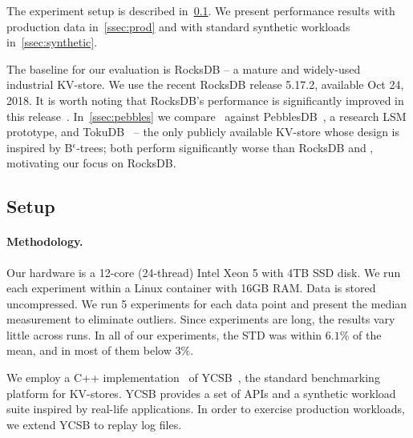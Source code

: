 
The experiment setup is described in~\cref{ssec:setup}. 
We present performance results with production data in~\cref{ssec:prod} and with standard synthetic workloads in~\cref{ssec:synthetic}. 

The baseline for our evaluation is RocksDB -- a mature and widely-used industrial KV-store. 
We use the recent RocksDB release 5.17.2, available Oct 24, 2018.  It is worth noting that RocksDB's performance 
is significantly improved  in this release~\cite{CallaghanCompaction}.   
In~\cref{ssec:pebbles} we compare \sys\ against PebblesDB~\cite{PebblesDB}, a research LSM prototype, and TokuDB~\cite{TokuDB} -- the only publicly 
available KV-store whose design is inspired by B$^\epsilon$-trees;  both  perform significantly worse than RocksDB and \sys, motivating our 
focus on RocksDB.

 
\subsection{Setup}
\label{ssec:setup} 

\paragraph{Methodology.} 
Our hardware is a 12-core (24-thread) Intel Xeon 5  with 4TB SSD disk.  
We run each experiment within a Linux container with 16GB RAM. 
Data is stored uncompressed.
We run 5 experiments for each data point and present the median measurement to eliminate outliers. Since experiments are long, the results vary 
little across runs. In all of our experiments, the STD was within $6.1\%$ of the mean, and in most of them below $3\%$. 

We employ a C++ implementation~\cite{Cpp-YCSB} of YCSB~\cite{YCSB}, the  standard  
benchmarking platform for KV-stores. YCSB provides a set of APIs and a synthetic workload suite inspired 
by real-life applications. In order to exercise production workloads, we extend YCSB to replay log files.
 
